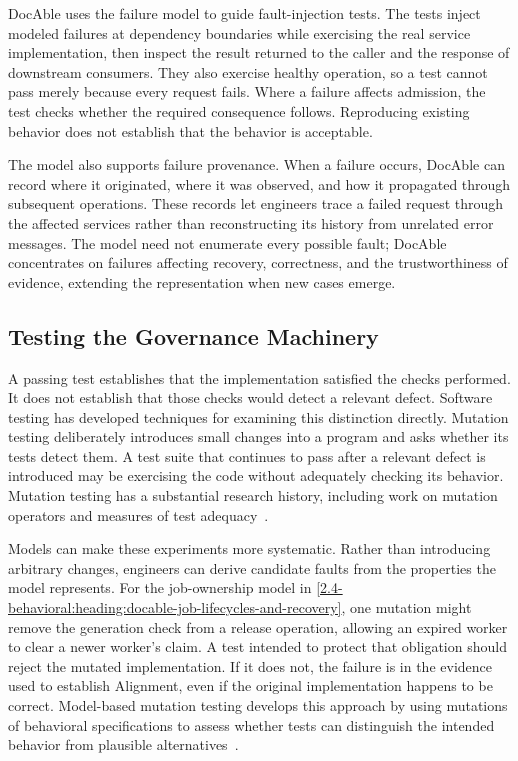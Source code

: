 DocAble uses the failure model to guide fault-injection tests. The tests inject modeled failures at dependency boundaries while exercising the real service implementation, then inspect the result returned to the caller and the response of downstream consumers. They also exercise healthy operation, so a test cannot pass merely because every request fails. Where a failure affects admission, the test checks whether the required consequence follows. Reproducing existing behavior does not establish that the behavior is acceptable.

The model also supports failure provenance. When a failure occurs, DocAble can record where it originated, where it was observed, and how it propagated through subsequent operations. These records let engineers trace a failed request through the affected services rather than reconstructing its history from unrelated error messages. The model need not enumerate every possible fault; DocAble concentrates on failures affecting recovery, correctness, and the trustworthiness of evidence, extending the representation when new cases emerge.

\subsection{Testing the Governance Machinery}\label{heading:testing-the-governance-machinery}

A passing test establishes that the implementation satisfied the checks performed. It does not establish that those checks would detect a relevant defect. Software testing has developed techniques for examining this distinction directly. Mutation testing deliberately introduces small changes into a program and asks whether its tests detect them. A test suite that continues to pass after a relevant defect is introduced may be exercising the code without adequately checking its behavior. Mutation testing has a substantial research history, including work on mutation operators and measures of test adequacy~\citep{demillo1978hints,jia2011analysis}.

Models can make these experiments more systematic. Rather than introducing arbitrary changes, engineers can derive candidate faults from the properties the model represents. For the job-ownership model in \autoref{2.4-behavioral:heading:docable-job-lifecycles-and-recovery}, one mutation might remove the generation check from a release operation, allowing an expired worker to clear a newer worker's claim. A test intended to protect that obligation should reject the mutated implementation. If it does not, the failure is in the evidence used to establish Alignment, even if the original implementation happens to be correct. Model-based mutation testing develops this approach by using mutations of behavioral specifications to assess whether tests can distinguish the intended behavior from plausible alternatives~\citep{aichernig2015modelmutation}.

